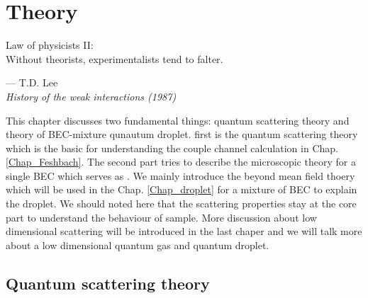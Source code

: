 \chapter{Theory}
\label{Chap:theory}

\setlength{\unitlength}{1pt}
\setlength{\epigraphwidth}{10cm}
\epigraph{Law of physicists II: \\ Without theorists, experimentalists tend to falter.}{--- T.D. Lee\\ \textit{History of the weak interactions (1987)}}

This chapter discusses two fundamental things: quantum scattering theory and theory of BEC-mixture qunautum droplet. first is the quantum scattering theory which is the basic for understanding the couple channel calculation in Chap. \ref{Chap_Feshbach}. The second part tries to describe the microscopic theory for a single BEC which serves as . We mainly introduce the beyond mean field thoery which will be used in the Chap. \ref{Chap_droplet} for a mixture of BEC to explain the droplet. We should noted here that the scattering properties stay at the core part to understand the behaviour of sample. More discussion about low dimensional scattering will be introduced in the last chaper and we will talk more about a low dimensional quantum gas and quantum droplet.

\section{Quantum scattering theory}
\label{sec:quan_scat}


